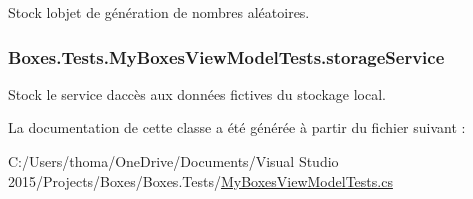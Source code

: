 Stock l\textquotesingle{}objet de génération de nombres aléatoires. 

\subsubsection[{\texorpdfstring{storage\+Service}{storageService}}]{ Boxes.\+Tests.\+My\+Boxes\+View\+Model\+Tests.\+storage\+Service\hspace{0.3cm}{\ttfamily [private]}}\hypertarget{class_boxes_1_1_tests_1_1_my_boxes_view_model_tests_ae40d71ffaa1877f7fa67e26f7e614574}{}\label{class_boxes_1_1_tests_1_1_my_boxes_view_model_tests_ae40d71ffaa1877f7fa67e26f7e614574}


Stock le service d\textquotesingle{}accès aux données fictives du stockage local. 



La documentation de cette classe a été générée à partir du fichier suivant \+:\begin{DoxyCompactItemize}
\item 
C\+:/\+Users/thoma/\+One\+Drive/\+Documents/\+Visual Studio 2015/\+Projects/\+Boxes/\+Boxes.\+Tests/\hyperlink{_my_boxes_view_model_tests_8cs}{My\+Boxes\+View\+Model\+Tests.\+cs}\end{DoxyCompactItemize}
